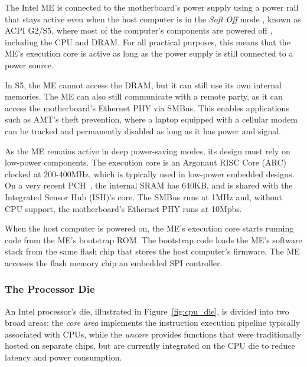 
The Intel ME is connected to the motherboard's power supply using a power rail
that stays active even when the host computer is in the \textit{Soft Off} mode
\cite{intel2015chipset}, known as ACPI G2/S5, where most of the computer's
components are powered off \cite{intel2010power}, including the CPU and DRAM.
For all practical purposes, this means that the ME's execution core is active
as long as the power supply is still connected to a power source.

In S5, the ME cannot access the DRAM, but it can still use its own internal
memories. The ME can also still communicate with a remote party, as it can
access the motherboard's Ethernet PHY via SMBus. This enables applications such
as AMT's theft prevention, where a laptop equipped with a cellular modem can be
tracked and permanently disabled as long as it has power and signal.

As the ME remains active in deep power-saving modes, its design must rely on
low-power components. The execution core is an Argonaut RISC Core (ARC) clocked
at 200-400MHz, which is typically used in low-power embedded designs. On a very
recent PCH~\cite{intel2015chipset}, the internal SRAM has 640KB, and is shared
with the Integrated Sensor Hub (ISH)'s core. The SMBus runs at 1MHz and,
without CPU support, the motherboard's Ethernet PHY runs at 10Mpbs.

When the host computer is powered on, the ME's execution core starts running
code from the ME's bootstrap ROM. The bootstrap code loads the ME's software
stack from the same flash chip that stores the host computer's firmware. The
ME accesses the flash memory chip an embedded SPI controller.


\subsubsection{The Processor Die}
\label{sec:cpu_die}

An Intel processor's die, illustrated in Figure~\ref{fig:cpu_die}, is divided
into two broad areas: the \textit{core area} implements the instruction
execution pipeline typically associated with CPUs, while the \textit{uncore}
provides functions that were traditionally hosted on separate chips, but are
currently integrated on the CPU die to reduce latency and power consumption.

